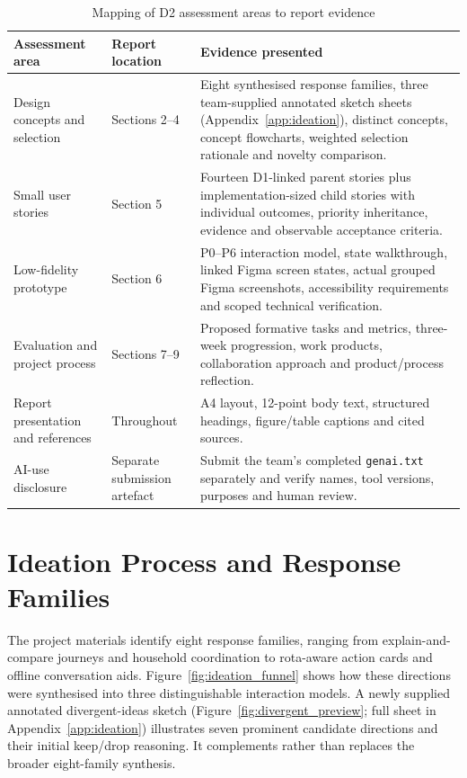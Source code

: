 \documentclass[12pt,a4paper]{article}
\newcommand{\code}[1]{\texttt{#1}}
\begin{document}
\begin{table}[H]
\centering
\small
\caption{Mapping of D2 assessment areas to report evidence}
\label{tab:assessment-map}
\begin{tabularx}{\textwidth}{|>{\raggedright\arraybackslash}p{3.1cm}|>{\raggedright\arraybackslash}p{2.6cm}|X|}
\toprule
\textbf{Assessment area} & \textbf{Report location} & \textbf{Evidence presented}\\
\midrule
Design concepts and selection & Sections 2--4 & Eight synthesised response families, three team-supplied annotated sketch sheets (Appendix~\ref{app:ideation}), distinct concepts, concept flowcharts, weighted selection rationale and novelty comparison.\\
\rowcolor{RowGray}
Small user stories & Section 5 & Fourteen D1-linked parent stories plus implementation-sized child stories with individual outcomes, priority inheritance, evidence and observable acceptance criteria.\\
Low-fidelity prototype & Section 6 & P0--P6 interaction model, state walkthrough, linked Figma screen states, actual grouped Figma screenshots, accessibility requirements and scoped technical verification.\\
\rowcolor{RowGray}
Evaluation and project process & Sections 7--9 & Proposed formative tasks and metrics, three-week progression, work products, collaboration approach and product/process reflection.\\
Report presentation and references & Throughout & A4 layout, 12-point body text, structured headings, figure/table captions and cited sources.\\
\rowcolor{RowGray}
AI-use disclosure & Separate submission artefact & Submit the team's completed \code{genai.txt} separately and verify names, tool versions, purposes and human review.\\
\bottomrule
\end{tabularx}
\end{table}

\clearpage
\section{Ideation Process and Response Families}

The project materials identify eight response families, ranging from explain-and-compare journeys and household coordination to rota-aware action cards and offline conversation aids. Figure~\ref{fig:ideation_funnel} shows how these directions were synthesised into three distinguishable interaction models. A newly supplied annotated divergent-ideas sketch (Figure~\ref{fig:divergent_preview}; full sheet in Appendix~\ref{app:ideation}) illustrates seven prominent candidate directions and their initial keep/drop reasoning. It complements rather than replaces the broader eight-family synthesis.
\end{document}
